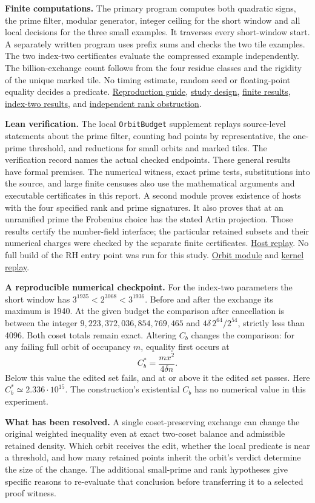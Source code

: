 \documentclass[11pt,letterpaper]{article}
\newcommand{\loc}[2]{\href{run:evidence/#1}{#2}}
\newcommand{\pp}[1]{\par\medskip\noindent\textbf{#1}\enspace}
\begin{document}
\pp{Finite computations.} The primary program computes both quadratic signs, the prime filter, modular generator, integer ceiling for the short window and all local decisions for the three small examples. It traverses every short-window start. A separately written program uses prefix sums and checks the two tile examples. The two index-two certificates evaluate the compressed example independently. The billion-exchange count follows from the four residue classes and the rigidity of the unique marked tile. No timing estimate, random seed or floating-point equality decides a predicate. \loc{README.md}{Reproduction guide}, \loc{DESIGN.md}{study design}, \loc{results.json}{finite results}, \loc{index_two.json}{index-two results}, and \loc{index_two_independent.json}{independent rank obstruction}.

\pp{Lean verification.} The local \texttt{OrbitBudget} supplement replays source-level statements about the prime filter, counting bad points by representative, the one-prime threshold, and reductions for small orbits and marked tiles. The verification record names the actual checked endpoints. These general results have formal premises. The numerical witness, exact prime tests, substitutions into the source, and large finite censuses also use the mathematical arguments and executable certificates in this report. A second module proves existence of hosts with the four specified rank and prime signatures. It also proves that at an unramified prime the Frobenius choice has the stated Artin projection. Those results certify the number-field interface; the particular retained subsets and their numerical charges were checked by the separate finite certificates. \loc{host/host_verified.json}{Host replay}. No full build of the RH entry point was run for this study. \loc{lean/OrbitBudget.lean}{Orbit module} and \loc{lean/verification.json}{kernel replay}.

\pp{A reproducible numerical checkpoint.} For the index-two parameters the short window has \(3^{1935}<2^{3068}<3^{1936}\). Before and after the exchange its maximum is 1940. At the given budget the comparison after cancellation is between the integer \(9{,}223{,}372{,}036{,}854{,}769{,}465\) and \(4\delta\,2^{64}/2^{54}\), strictly less than 4096. Both coset totals remain exact. Altering \(C_b\) changes the comparison: for any failing full orbit of occupancy \(m\), equality first occurs at
\[
            C_b^*=\frac{m x^2}{4\delta n}.
\]
Below this value the edited set fails, and at or above it the edited set passes. Here \(C_b^*\simeq 2.336\cdot10^{15}\). The construction's existential \(C_b\) has no numerical value in this experiment.

\pp{What has been resolved.} A single coset-preserving exchange can change the original weighted inequality even at exact two-coset balance and admissible retained density. Which orbit receives the edit, whether the local predicate is near a threshold, and how many retained points inherit the orbit's verdict determine the size of the change. The additional small-prime and rank hypotheses give specific reasons to re-evaluate that conclusion before transferring it to a selected proof witness.
\end{document}

